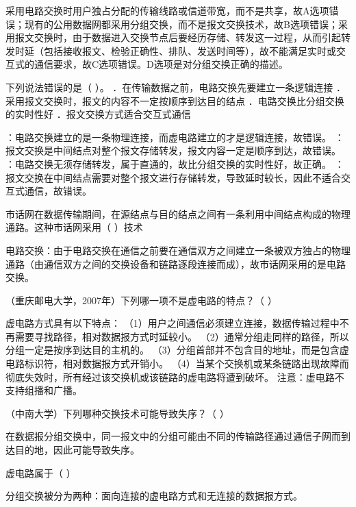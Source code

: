 \begin{solution}采用电路交换时用户独占分配的传输线路或信道带宽，而不是共享，故A选项错误；现有的公用数据网都采用分组交换，而不是报文交换技术，故B选项错误；采用报文交换时，由于数据进入交换节点后要经历存储、转发这一过程，从而引起转发时延（包括接收报文、检验正确性、排队、发送时间等），故不能满足实时或交互式的通信要求，故C选项错误。D选项是对分组交换正确的描述。
\end{solution}
\question 下列说法错误的是（ ）。 ．在传输数据之前，电路交换先要建立一条逻辑连接
．采用报文交换时，报文的内容不一定按顺序到达目的结点
．电路交换比分组交换的实时性好 ．报文交换方式适合交互式通信
\par{}
\begin{solution}：电路交换建立的是一条物理连接，而虚电路建立的才是逻辑连接，故错误。
：报文交换是中间结点对整个报文存储转发，报文内容一定是顺序到达，故错误。
：电路交换无须存储转发，属于直通的，故比分组交换的实时性好，故正确。
：报文交换在中间结点需要对整个报文进行存储转发，导致延时较长，因此不适合交互式通信，故错误。
\end{solution}
\question 市话网在数据传输期间，在源结点与目的结点之间有一条利用中间结点构成的物理通路。这种市话网采用（
）技术
\par{}
\begin{solution}电路交换：由于电路交换在通信之前要在通信双方之间建立一条被双方独占的物理通路（由通信双方之间的交换设备和链路逐段连接而成），故市话网采用的是电路交换。
\end{solution}
\question （重庆邮电大学，2007年）下列哪一项不是虚电路的特点？（ ）
\par{}
\begin{solution}虚电路方式具有以下特点：
（1）用户之间通信必须建立连接，数据传输过程中不再需要寻找路径，相对数据报方式时延较小。
（2）通常分组走同样的路径，所以分组一定是按序到达目的主机的。
（3）分组首部并不包含目的地址，而是包含虚电路标识符，相对数据报方式开销小。
（4）当某个交换机或某条链路出现故障而彻底失效时，所有经过该交换机或该链路的虚电路将遭到破坏。
注意：虚电路不支持组播和广播。
\end{solution}
\question （中南大学）下列哪种交换技术可能导致失序？（ ）
\par{}
\begin{solution}在数据报分组交换中，同一报文中的分组可能由不同的传输路径通过通信子网而到达目的地，因此可能导致失序。
\end{solution}
\question 虚电路属于（ ）
\par{}
\begin{solution}分组交换被分为两种：面向连接的虚电路方式和无连接的数据报方式。
\end{solution}

